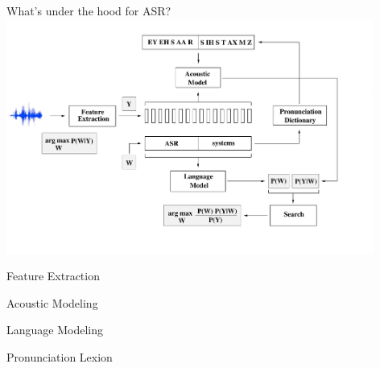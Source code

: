 \begin{frame}{What's under the hood for ASR?}
\includegraphics[height=77mm]{figures/ASR9}
\end{frame}

\begin{frame}{Feature Extraction}
\end{frame}

\begin{frame}{Acoustic Modeling}
\end{frame}

\begin{frame}{Language Modeling}
\end{frame}

\begin{frame}{Pronunciation Lexion}
\end{frame}
